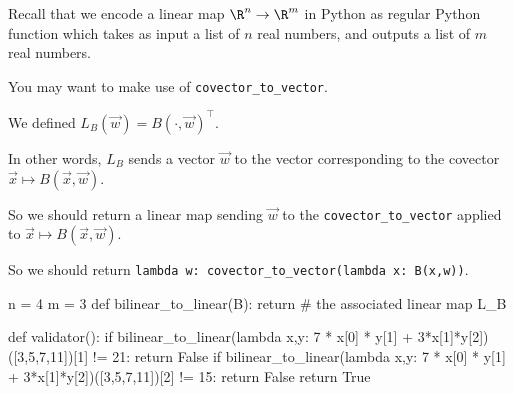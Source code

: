 \documentclass{ximera}
\begin{document}
\begin{question}
  Recall that we encode a linear map $\R^n \to \R^m$ in Python as regular Python function which takes as input a list of $n$ real numbers, and outputs a list of $m$ real numbers.

  \begin{solution}
    \begin{hint}
      You may want to make use of \texttt{covector\_to\_vector}.
    \end{hint}
    \begin{hint}
      We defined $L_B(\vec{w}) = B(\cdot,\vec{w})^\top$.
    \end{hint}
    \begin{hint}
      In other words, $L_B$ sends a vector $\vec{w}$ to the vector corresponding to the covector $\vec{x} \mapsto B(\vec{x},\vec{w})$.
    \end{hint}
    \begin{hint}
      So we should return a linear map sending $\vec{w}$ to the \texttt{covector\_to\_vector} applied to $\vec{x} \mapsto B(\vec{x},\vec{w})$.
    \end{hint}
    \begin{hint}
      So we should return \texttt{lambda w: covector_to_vector(lambda x: B(x,w))}.
    \end{hint}
    \begin{python}
n = 4
m = 3
def bilinear_to_linear(B):
  return # the associated linear map L_B

def validator():
  if bilinear_to_linear(lambda x,y: 7 * x[0] * y[1] + 3*x[1]*y[2])([3,5,7,11])[1] != 21:
    return False
  if bilinear_to_linear(lambda x,y: 7 * x[0] * y[1] + 3*x[1]*y[2])([3,5,7,11])[2] != 15:
    return False
  return True
    \end{python}
  \end{solution}

\end{question}
\end{document}
